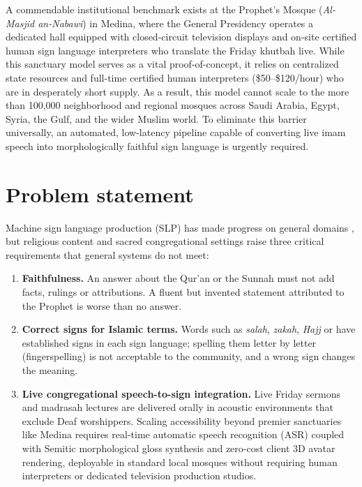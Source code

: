 A commendable institutional benchmark exists at the Prophet's Mosque (\textit{Al-Masjid an-Nabawi}) in Medina, where the General Presidency operates a dedicated hall equipped with closed-circuit television displays and on-site certified human sign language interpreters who translate the Friday khutbah live. While this sanctuary model serves as a vital proof-of-concept, it relies on centralized state resources and full-time certified human interpreters (\$50--\$120/hour) who are in desperately short supply. As a result, this model cannot scale to the more than 100,000 neighborhood and regional mosques across Saudi Arabia, Egypt, Syria, the Gulf, and the wider Muslim world. To eliminate this barrier universally, an automated, low-latency pipeline capable of converting live imam speech into morphologically faithful sign language is urgently required.

\section{Problem statement}
Machine sign language production (SLP) has made progress on general domains \cite{progressivetransformers,text2sign,
slpreview,slpsurvey,signllm,slrtp2025}, but religious content and sacred congregational settings raise three critical requirements that general systems do not meet:
\begin{enumerate}[leftmargin=*,itemsep=1pt]
  \item \textbf{Faithfulness.} An answer about the Qur'an or the Sunnah must not add facts, rulings or attributions.
        A fluent but invented statement attributed to the Prophet  is worse than no answer.
  \item \textbf{Correct signs for Islamic terms.} Words such as \emph{salah}, \emph{zakah}, \emph{Hajj} or
         have established signs in each sign language; spelling them letter by letter
        (fingerspelling) is not acceptable to the community, and a wrong sign changes the meaning.
  \item \textbf{Live congregational speech-to-sign integration.} Live Friday sermons and madrasah lectures are delivered orally in acoustic environments that exclude Deaf worshippers. Scaling accessibility beyond premier sanctuaries like Medina requires real-time automatic speech recognition (ASR) coupled with Semitic morphological gloss synthesis and zero-cost client 3D avatar rendering, deployable in standard local mosques without requiring human interpreters or dedicated television production studios.
\end{enumerate}

